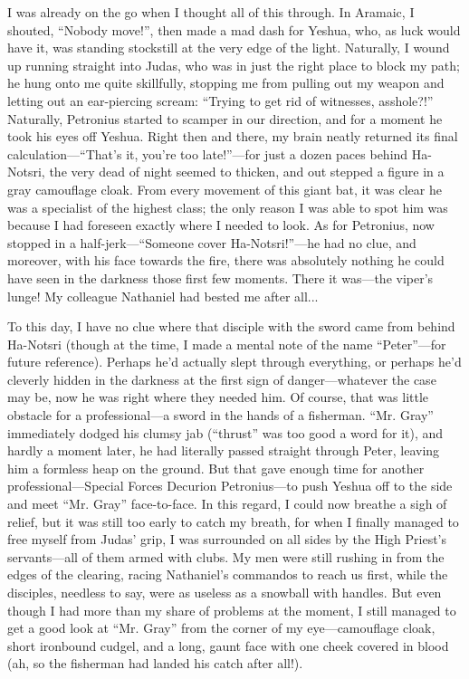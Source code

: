 I was already on the go when I thought all of this through. In Aramaic, I shouted, ``Nobody move!'', then made a mad dash for Yeshua, who, as luck would have it, was standing stockstill at the very edge of the light. Naturally, I wound up running straight into Judas, who was in just the right place to block my path; he hung onto me quite skillfully, stopping me from pulling out my weapon and letting out an ear-piercing scream: ``Trying to get rid of witnesses, asshole?!'' Naturally, Petronius started to scamper in our direction, and for a moment he took his eyes off Yeshua. Right then and there, my brain neatly returned its final calculation---``That's it, you're too late!''---for just a dozen paces behind Ha-Notsri, the very dead of night seemed to thicken, and out stepped a figure in a gray camouflage cloak. From every movement of this giant bat, it was clear he was a specialist of the highest class; the only reason I was able to spot him was because I had foreseen exactly where I needed to look. As for Petronius, now stopped in a half-jerk---``Someone cover Ha-Notsri!''---he had no clue, and moreover, with his face towards the fire, there was absolutely nothing he could have seen in the darkness those first few moments. There it was---the viper's lunge! My colleague Nathaniel had bested me after all...

To this day, I have no clue where that disciple with the sword came from behind Ha-Notsri (though at the time, I made a mental note of the name ``Peter''---for future reference). Perhaps he'd actually slept through everything, or perhaps he'd cleverly hidden in the darkness at the first sign of danger---whatever the case may be, now he was right where they needed him. Of course, that was little obstacle for a professional---a sword in the hands of a fisherman. ``Mr. Gray'' immediately dodged his clumsy jab (``thrust'' was too good a word for it), and hardly a moment later, he had literally passed straight through Peter, leaving him a formless heap on the ground. But that gave enough time for another professional---Special Forces Decurion Petronius---to push Yeshua off to the side and meet ``Mr. Gray'' face-to-face. In this regard, I could now breathe a sigh of relief, but it was still too early to catch my breath, for when I finally managed to free myself from Judas' grip, I was surrounded on all sides by the High Priest's servants---all of them armed with clubs. My men were still rushing in from the edges of the clearing, racing Nathaniel's commandos to reach us first, while the disciples, needless to say, were as useless as a snowball with handles. But even though I had more than my share of problems at the moment, I still managed to get a good look at ``Mr. Gray'' from the corner of my eye---camouflage cloak, short ironbound cudgel, and a long, gaunt face with one cheek covered in blood (ah, so the fisherman had landed his catch after all!).

